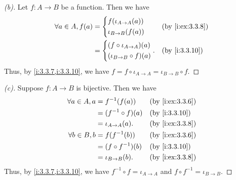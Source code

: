 \begin{proof}[(b)]
  Let \(f : A \to B\) be a function.
  Then we have
  \begin{align*}
    \forall a \in A, f(a) & = \begin{dcases}
                                f(\iota_{A \to A}(a)) \\
                                \iota_{B \to B}(f(a))
                              \end{dcases}        &  & \by{i:ex:3.3.8} \\
                          & = \begin{dcases}
                                (f \circ \iota_{A \to A})(a) \\
                                (\iota_{B \to B} \circ f)(a)
                              \end{dcases}. &  & \by{i:3.3.10}
  \end{align*}
  Thus, by \cref{i:3.3.7,i:3.3.10}, we have \(f = f \circ \iota_{A \to A} = \iota_{B \to B} \circ f\).
\end{proof}

\begin{proof}[(c)]
  Suppose \(f : A \to B\) is bijective.
  Then we have
  \begin{align*}
    \forall a \in A, a & = f^{-1}(f(a))        &  & \by{i:ex:3.3.6} \\
                       & = (f^{-1} \circ f)(a) &  & \by{i:3.3.10}   \\
                       & = \iota_{A \to A}(a). &  & \by{i:ex:3.3.8} \\
    \forall b \in B, b & = f(f^{-1}(b))        &  & \by{i:ex:3.3.6} \\
                       & = (f \circ f^{-1})(b) &  & \by{i:3.3.10}   \\
                       & = \iota_{B \to B}(b). &  & \by{i:ex:3.3.8}
  \end{align*}
  Thus, by \cref{i:3.3.7,i:3.3.10}, we have \(f^{-1} \circ f = \iota_{A \to A}\) and \(f \circ f^{-1} = \iota_{B \to B}\).
\end{proof}

